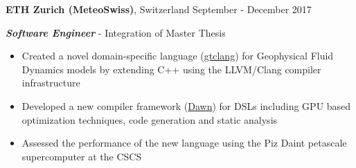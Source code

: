 \textbf{ETH Zurich (MeteoSwiss)}, Switzerland  \hfill September - December 2017

\textbf{\textit{Software Engineer}} - Integration of Master Thesis
\begin{itemize}
    \item Created a novel domain-specific language (\href{https://github.com/MeteoSwiss-APN/gtclang}{gtclang}) for Geophysical Fluid Dynamics models by extending C++ using the LLVM/Clang compiler infrastructure
	\item Developed a new compiler framework (\href{https://github.com/MeteoSwiss-APN/dawn}{Dawn}) for DSLs including GPU based optimization techniques, code generation and static analysis
	\item Assessed the performance of the new language using the Piz Daint petascale supercomputer at the CSCS
\end{itemize}
